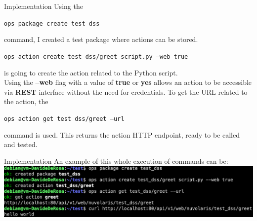 \documentclass[aspectratio=169]{beamer}
\begin{document}
\begin{frame}{Implementation}
Using the \vspace{-15pt}
\begin{center}
    \colorbox{codegray}{\texttt{ops package create test dss}}\vspace{-5pt}
\end{center} 
command, I created a test package where actions can be stored.\vspace{-5pt}
\begin{center}
    \colorbox{codegray}{\texttt{ops action create test dss/greet script.py --web true}}\vspace{-5pt} 
\end{center}
is going to create the action related to the Python script.\\
Using the \textbf{–web} flag with a value of \textbf{true} or \textbf{yes} allows an action to be accessible via \textbf{REST} interface without the need for credentials.
To get the URL related to the action, the \vspace{-15pt}
\begin{center}
    \colorbox{codegray}{\texttt{ops action get test dss/greet --url}}\vspace{-5pt}
\end{center}
command is used. This returns the action HTTP endpoint, ready to be called and tested.
\end{frame}

\begin{frame}{Implementation}
An example of this whole execution of commands can be:\vspace{14pt}\\
\centering
\includegraphics[width=1\textwidth]{img/demo.png}
\end{frame}
\end{document}
